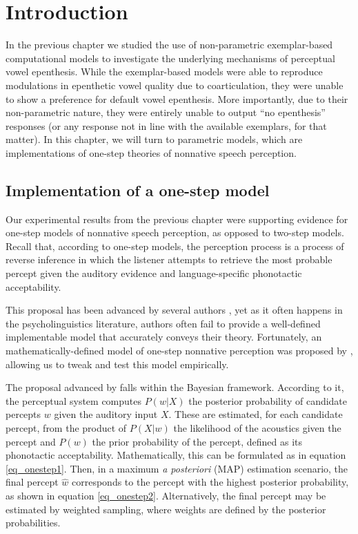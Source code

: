\section{Introduction}
In the previous chapter we studied the use of non-parametric exemplar-based computational models to investigate the underlying mechanisms of perceptual vowel epenthesis. While the exemplar-based models were able to reproduce modulations in epenthetic vowel quality due to coarticulation, they were unable to show a preference for default vowel epenthesis. More importantly, due to their non-parametric nature, they were entirely unable to output ``no epenthesis'' responses (or any response not in line with the available exemplars, for that matter). In this chapter, we will turn to parametric models, which are implementations of one-step theories of nonnative speech perception.  

\subsection{Implementation of a one-step model}
Our experimental results from the previous chapter were supporting evidence for one-step models of nonnative speech perception, as opposed to two-step models.
Recall that, according to one-step models, the perception process is a process of reverse inference in which the listener attempts to retrieve the most probable percept given the auditory evidence and language-specific phonotactic acceptability.

This proposal has been advanced by several authors \cite{dupoux2011, dejong2012, wilson2013, durvasula2015}, yet as it often happens in the psycholinguistics literature, authors often fail to provide a well-defined implementable model that accurately conveys their theory. Fortunately, an mathematically-defined model of one-step nonnative perception was proposed by \cite{wilson2013}, allowing us to tweak and test this model empirically.

The proposal advanced by \cite{wilson2013} falls within the Bayesian framework. 
According to it, the perceptual system computes $P(w | X)$ the posterior probability of candidate percepts $w$ given the auditory input $X$. These are estimated, for each candidate percept, from the product of $P(X|w)$ the likelihood of the acoustics given the percept and $P(w)$ the prior probability of the percept, defined as its phonotactic acceptability. Mathematically, this can be formulated as in equation \ref{eq_onestep1}. Then, in a maximum \textit{a posteriori} (MAP) estimation scenario, the final percept $\widehat{w}$ corresponds to the percept with the highest posterior probability, as shown in equation \ref{eq_onestep2}. Alternatively, the final percept may be estimated by weighted sampling, where weights are defined by the posterior probabilities.     

